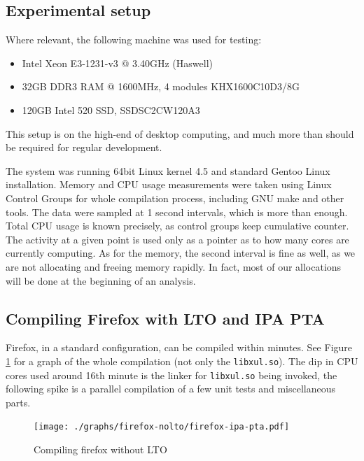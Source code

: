 \subsection{Experimental setup}

Where relevant, the following machine was used for testing:

\begin{itemize}
	\item Intel Xeon E3-1231-v3 @ 3.40GHz (Haswell)
	\item 32GB DDR3 RAM @ 1600MHz, 4 modules KHX1600C10D3/8G
	\item 120GB Intel 520 SSD, SSDSC2CW120A3
\end{itemize}

This setup is on the high-end of desktop computing, and much more than
should be required for regular development. 

The system was running 64bit Linux kernel 4.5 and standard Gentoo Linux
installation. Memory and CPU usage measurements were taken using Linux Control
Groups  for whole compilation process, including GNU make and other tools. The
data were sampled at 1 second intervals, which is more than enough. Total CPU
usage is known precisely, as control groups keep cumulative counter. The
activity at a given point is used only as a pointer as to how many cores are
currently computing. As for the memory, the second interval is fine as well, as
we are not allocating and freeing memory rapidly. In fact, most of our
allocations will be done at the beginning of an analysis.

\subsection{Compiling Firefox with LTO and IPA PTA}
\label{section-firefox-lto-pta}

Firefox, in a standard configuration, can be compiled within minutes. See Figure
\ref{figure-firefox-nolto} for a graph of the whole compilation (not only the
{\tt libxul.so}). The dip in CPU cores used around 16th minute is the linker for
{\tt libxul.so} being invoked, the following spike is a parallel compilation of a few
unit tests and miscellaneous parts.

\begin{figure}[h!]
	\label{figure-firefox-nolto}
	\centering
	\texttt{[image: ./graphs/firefox-nolto/firefox-ipa-pta.pdf]}
	\caption{Compiling firefox without LTO}
\end{figure}


